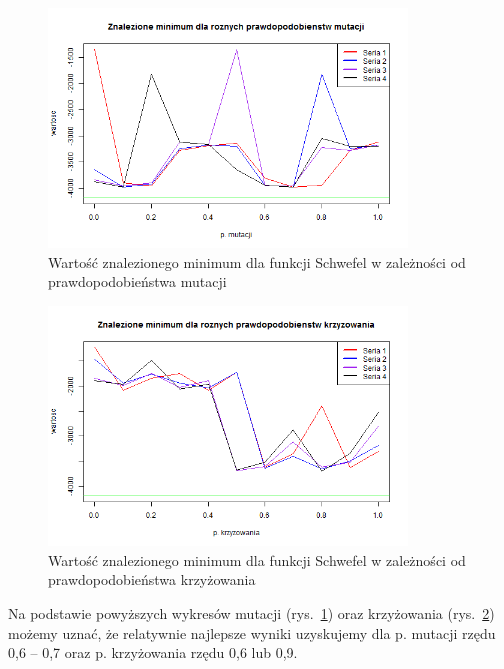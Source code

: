 \documentclass[11pt, a4paper]{article}
\newcommand{\fbi}{\leavevmode{\parindent=1em\indent}}
\begin{document}
\begin{figure}[H]
	\begin{center}
		\includegraphics[width=0.85\textwidth]{./assets/Schwefel2.png}
		\caption{Wartość znalezionego minimum dla funkcji Schwefel w zależności od prawdopodobieństwa mutacji}
		\label{fig:schwefel2}
	\end{center}
\end{figure}

\begin{figure}[H]
	\begin{center}
		\includegraphics[width=0.85\textwidth]{./assets/Schwefel3.png}
		\caption{Wartość znalezionego minimum dla funkcji Schwefel w zależności od prawdopodobieństwa krzyżowania}
		\label{fig:schwefel3}
	\end{center}
\end{figure}

\fbi
Na podstawie powyższych wykresów mutacji (rys.~\ref{fig:schwefel2}) oraz krzyżowania (rys.~\ref{fig:schwefel3}) możemy uznać, że relatywnie najlepsze wyniki uzyskujemy dla p. mutacji rzędu 0,6 -- 0,7 oraz p. krzyżowania rzędu 0,6 lub 0,9.
\end{document}
